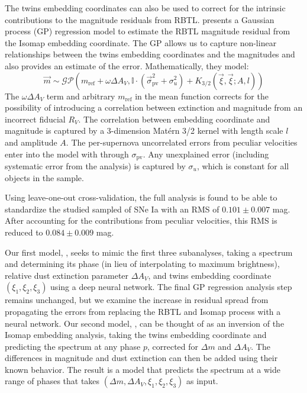The twins embedding coordinates can also be used to correct for the intrinsic contributions to the magnitude residuals from RBTL.  presents a Gaussian process (GP) regression model to estimate the RBTL magnitude residual from the Isomap embedding coordinate. The GP allows us to capture non-linear relationships between the twins embedding coordinates and the magnitudes and also provides an estimate of the error. Mathematically, they model:
\begin{equation}
    \vec{m} \sim \mathcal{GP}\left(m_{\text{ref}} + \omega\Delta A_V, \mathbb{I}\cdot(\vec{\sigma}_{\text{pv}}^2 + \sigma_u^2) + K_{3/2}(\vec{\xi}, \vec{\xi}; A, l)\right)
    \label{eqn:gp}
\end{equation}
The $\omega\Delta A_V$ term and arbitrary $m_{\text{ref}}$ in the mean function corrects for the possibility of introducing a correlation between extinction and magnitude from an incorrect fiducial $R_V$. The correlation between embedding coordinate and magnitude is captured by a 3-dimension Mat\'{e}rn 3/2 kernel with length scale $l$ and amplitude $A$. The per-supernova uncorrelated errors from peculiar velocities enter into the model with through $\sigma_{\text{pv}}$. Any unexplained error (including systematic error from the analysis) is captured by $\sigma_u$, which is constant for all objects in the sample.

Using leave-one-out cross-validation, the full analysis is found to be able to standardize the studied sampled of SNe Ia with an RMS of $0.101 \pm 0.007$ mag. After accounting for the contributions from peculiar velocities, this RMS is reduced to $0.084 \pm 0.009$ mag.

Our first model, \stoe, seeks to mimic the first three subanalyses, taking a spectrum and determining its phase (in lieu of interpolating to maximum brightness), relative dust extinction parameter $\Delta A_V$, and twins embedding coordinate $(\xi_1, \xi_2, \xi_3)$ using a deep neural network. The final GP regression analysis step remains unchanged, but we examine the increase in residual spread from propagating the errors from replacing the RBTL and Isomap process with a neural network. Our second model, \etos, can be thought of as an inversion of the Isomap embedding analysis, taking the twins embedding coordinate and predicting the spectrum at any phase $p$, corrected for $\Delta m$ and $\Delta A_V$. The differences in magnitude and dust extinction can then be added using their known behavior. The result is a model that predicts the spectrum at a wide range of phases that takes $(\Delta m, \Delta A_V, \xi_1, \xi_2, \xi_3)$ as input.

